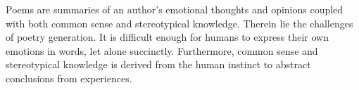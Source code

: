 Poems are summaries of an author's emotional thoughts and opinions coupled with both common sense and stereotypical knowledge. Therein lie the challenges of poetry generation. It is difficult enough for humans to express their own emotions in words, let alone succinctly. Furthermore, common sense and stereotypical knowledge is derived from the human instinct to abstract conclusions from experiences. 


